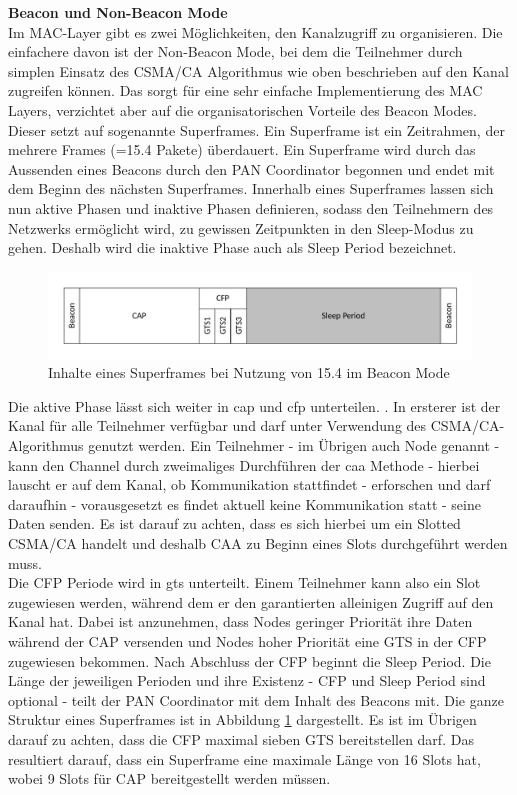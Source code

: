 \textbf{Beacon und Non-Beacon Mode}\\
Im MAC-Layer gibt es zwei Möglichkeiten, den Kanalzugriff zu organisieren. Die einfachere davon ist der Non-Beacon Mode, bei dem die Teilnehmer durch simplen Einsatz des CSMA/CA Algorithmus wie oben beschrieben auf den Kanal zugreifen können. Das sorgt für eine sehr einfache Implementierung des MAC Layers, verzichtet aber auf die organisatorischen Vorteile des Beacon Modes.\\
Dieser setzt auf sogenannte Superframes. Ein Superframe ist ein Zeitrahmen, der mehrere Frames (=15.4 Pakete) überdauert. Ein Superframe wird durch das Aussenden eines Beacons durch den PAN Coordinator begonnen und endet mit dem Beginn des nächsten Superframes. Innerhalb eines Superframes lassen sich nun aktive Phasen und inaktive Phasen definieren, sodass den Teilnehmern des Netzwerks ermöglicht wird, zu gewissen Zeitpunkten in den Sleep-Modus zu gehen. Deshalb wird die inaktive Phase auch als Sleep Period bezeichnet.\\
\begin{figure}
	\centering
	\includegraphics[width=\textwidth]{Grafiken-Alex/superframe.pdf}
	\caption{Inhalte eines Superframes bei Nutzung von 15.4 im Beacon Mode}
	\label{superframe}
\end{figure}
Die aktive Phase lässt sich weiter in \ac{cap} und \ac{cfp} unterteilen. \cite{superframestructure}. In ersterer ist der Kanal für alle Teilnehmer verfügbar und darf unter Verwendung des CSMA/CA-Algorithmus genutzt werden. Ein Teilnehmer - im Übrigen auch Node genannt - kann den Channel durch zweimaliges Durchführen der \ac{caa} Methode - hierbei lauscht er auf dem Kanal, ob Kommunikation stattfindet - erforschen und darf daraufhin - vorausgesetzt es findet aktuell keine Kommunikation statt - seine Daten senden. \cite{sarodeslottedscmaca} Es ist darauf zu achten, dass es sich hierbei um ein Slotted CSMA/CA handelt und deshalb CAA zu Beginn eines Slots durchgeführt werden muss. \\
Die CFP Periode wird in \ac{gts} unterteilt. Einem Teilnehmer kann also ein Slot zugewiesen werden, während dem er den garantierten alleinigen Zugriff auf den Kanal hat. Dabei ist anzunehmen, dass Nodes geringer Priorität ihre Daten während der CAP versenden und Nodes hoher Priorität eine GTS in der CFP zugewiesen bekommen. Nach Abschluss der CFP beginnt die Sleep Period. Die Länge der jeweiligen Perioden und ihre Existenz - CFP und Sleep Period sind optional - teilt der PAN Coordinator mit dem Inhalt des Beacons mit. Die ganze Struktur eines Superframes ist in Abbildung \ref{superframe} dargestellt. Es ist im Übrigen darauf zu achten, dass die CFP maximal sieben GTS bereitstellen darf. Das resultiert darauf, dass ein Superframe eine maximale Länge von 16 Slots hat, wobei 9 Slots für CAP bereitgestellt werden müssen.\\
